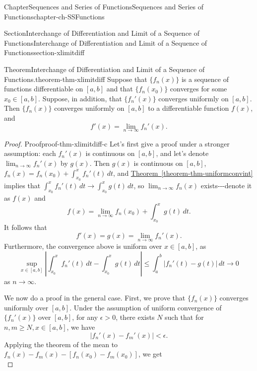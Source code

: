 \documentclass[oneside,10pt,]{book}
\newcommand{\xreffont}{\relax}
\numberwithin{equation}{section}
\newcommand{\lt}{<}
\begin{document}
\begin{chapterptx}{Chapter}{Sequences and Series of Functions}{}{Sequences and Series of Functions}{}{}{chapter-ch-SSFunctions}
\begin{sectionptx}{Section}{Interchange of Differentiation and Limit of a Sequence of  Functions}{}{Interchange of Differentiation and Limit of a Sequence of  Functions}{}{}{section-xlimitdiff}
\begin{theorem}{Theorem}{Interchange of Differentiation and Limit of a Sequence of  Functions.}{}{theorem-thm-xlimitdiff}%
Suppose that \(\{f_n(x)\}\) is a sequence of functions differentiable on \([a, b]\) and that \(\{f_n(x_0)\}\) converges for some \(x_0 \in [a, b]\). Suppose, in addition, that \(\{f_n'(x)\}\) converges uniformly on \([a, b]\). Then \(\{f_n(x)\}\) converges uniformly on \([a, b]\) to a differentiable function \(f(x)\), and%
\begin{equation*}
f'(x)=\lim_{n\to \infty} f_n'(x).
\end{equation*}
%
\end{theorem}
\begin{proof}{Proof}{}{proof-thm-xlimitdiff-c}
Let's first give a proof under a stronger assumption: each \(f_n'(x)\) is continuous on \([a, b]\), and let's denote \(\lim_{n\to\infty} f_n'(x)\) by \(g(x)\). Then  \(g(x)\) is continuous on \([a, b]\), \(f_n(x)=f_n(x_0)+\int_{x_0}^x f_n'(t)\, dt\), and \hyperref[theorem-thm-uniformconvint]{Theorem~{\xreffont\ref{theorem-thm-uniformconvint}}} implies that \(\int_{x_0}^x f_n'(t)\, dt\to \int_{x_0}^x g(t)\, dt\), so \(\lim_{n\to\infty} f_n(x)\) exists-{}-{}-denote it as \(f(x)\) and%
\begin{equation*}
f(x)=\lim_{n\to\infty} f_n(x_0)+  \int_{x_0}^x g(t)\, dt\text{.}
\end{equation*}
It follows that%
\begin{equation*}
f'(x)= g(x)=\lim_{n\to \infty} f_n'(x).
\end{equation*}
Furthermore, the convergence above is uniform over \(x\in [a, b]\), as%
\begin{equation*}
\sup_{x\in [a, b]} \left| \int_{x_0}^x f_n'(t)\, dt- \int_{x_0}^x g(t)\, dt \right|
\le \int_a^b \left| f_n'(t)-g(t)\right|\, dt \to 0
\end{equation*}
as \(n\to \infty\).%
\par
We now do a proof in the general case. First, we prove that \(\{f_n(x)\}\) converges uniformly over \([a, b]\). Under the assumption of uniform convergence of \(\{f_n'(x)\}\) over \([a, b]\), for any \(\epsilon >0\), there exists \(N\) such that for \(n, m\ge N, x\in [a, b]\), we have%
\begin{equation}
|f_n'(x)-f_m'(x)| \lt \epsilon.\label{men-duc}
\end{equation}
Applying the theorem of the mean to \(f_n(x)-f_m(x)-\left[ f_n(x_0)-f_m(x_0)\right]\), we get%
\begin{equation*}

\end{equation*}
\end{proof}
\end{sectionptx}
\end{chapterptx}
\end{document}
